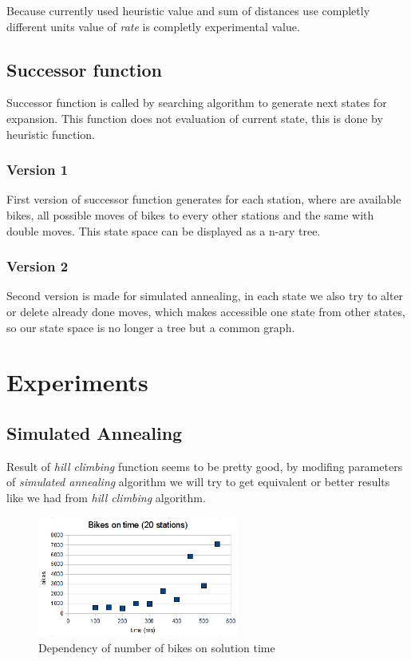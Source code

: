 \documentclass[11pt,twoside,a4paper]{mr}%
\begin{document}
Because currently used heuristic value and sum of distances use completly different units value of \textsl{rate} is completly experimental value.


\section{Successor function}
Successor function is called by searching algorithm to generate next states for expansion. This function does not evaluation of current state, this is done by heuristic function.

\subsection*{Version 1}
First version of successor function generates for each station, where are available bikes, all possible moves of bikes to every other stations and the same with double moves. This state space can be displayed as a n-ary tree.

\subsection*{Version 2}
Second version is made for simulated annealing, in each state we also try to alter or delete already done moves, which makes accessible one state from other states, so our state space is no longer a tree but a common graph.   

\chapter{Experiments}

\section{Simulated Annealing}
Result of \textsl{hill climbing} function seems to be pretty good, by modifing parameters of \textsl{simulated annealing} algorithm we will try to get equivalent or better results like we had from \textsl{hill climbing} algorithm.
 
\begin{figure}[ht]
\begin{center}
\includegraphics[width=250px]{images/bikes-time.png}
\caption{Dependency of number of bikes on solution time }
\label{sa:bikes-time}
\end{center}
\end{figure}
\end{document}
